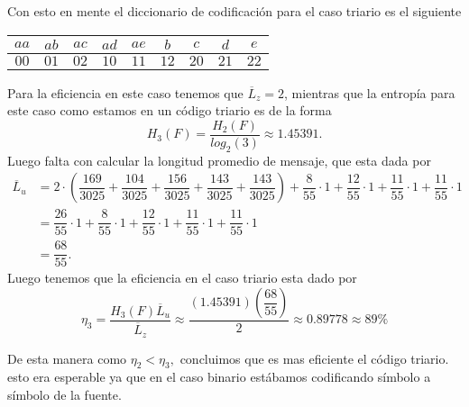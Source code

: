 \begin{sols}
\begin{center}
    \end{center}
Con esto en mente el diccionario de codificación para el caso triario es el siguiente
\begin{center}
  \begin{tabular}{|c|c|c|c|c|c|c|c|c|}
  \hline
$aa$ & $ab$ & $ac$ & $ad$ & $ae$ & $b$ & $c$ & $d$ & $e$\\
\hline
$00$ & $01$ & $02$ & $10$ & $11$ & $12$ & $20$ & $21$ & $22$\\
\hline
 \end{tabular}
 \end{center}
Para la eficiencia en este caso tenemos que $\overline{L}_z=2$, mientras que la entropía para este caso como estamos en un código triario es de la forma
$$H_3(F)=\dfrac{H_2(F)}{log_2(3)}\approx1.45391.$$
Luego falta con calcular la longitud promedio de mensaje, que esta dada por
\begin{align*}
    \overline{L}_u&=2\cdot\left(\dfrac{169}{3025}+\dfrac{104}{3025}+\dfrac{156}{3025}+\dfrac{143}{3025}+\dfrac{143}{3025}\right)+\dfrac{8}{55}\cdot1+\dfrac{12}{55}\cdot1+\dfrac{11}{55}\cdot1+\dfrac{11}{55}\cdot1\\
    &=\dfrac{26}{55}\cdot1+\dfrac{8}{55}\cdot1+\dfrac{12}{55}\cdot1+\dfrac{11}{55}\cdot1+\dfrac{11}{55}\cdot1\\
   &=\dfrac{68}{55}. 
\end{align*}
Luego tenemos que la eficiencia en el caso triario esta dado por
$$\eta_3=\dfrac{H_3(F)\overline{L}_u}{\overline{L}_z}\approx\dfrac{(1.45391)\left(\dfrac{68}{55}\right)}{2}\approx 0.89778\approx 89\%$$

De esta manera como $\eta_2<\eta_3,$ concluimos que es mas eficiente el código triario. esto era esperable ya que en el caso binario estábamos codificando símbolo a símbolo de la fuente.

\end{sols}